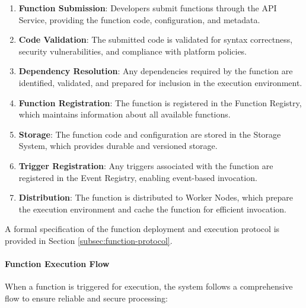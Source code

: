 \begin{enumerate}
    \item \textbf{Function Submission}: Developers submit functions through the API Service, providing the function code, configuration, and metadata.
    
    \item \textbf{Code Validation}: The submitted code is validated for syntax correctness, security vulnerabilities, and compliance with platform policies.
    
    \item \textbf{Dependency Resolution}: Any dependencies required by the function are identified, validated, and prepared for inclusion in the execution environment.
    
    \item \textbf{Function Registration}: The function is registered in the Function Registry, which maintains information about all available functions.
    
    \item \textbf{Storage}: The function code and configuration are stored in the Storage System, which provides durable and versioned storage.
    
    \item \textbf{Trigger Registration}: Any triggers associated with the function are registered in the Event Registry, enabling event-based invocation.
    
    \item \textbf{Distribution}: The function is distributed to Worker Nodes, which prepare the execution environment and cache the function for efficient invocation.
\end{enumerate}

A formal specification of the function deployment and execution protocol is provided in Section \ref{subsec:function-protocol}.





\paragraph{Function Execution Flow}
When a function is triggered for execution, the system follows a comprehensive flow to ensure reliable and secure processing:

